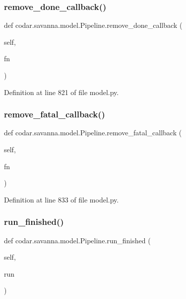 \subsubsection{\texorpdfstring{remove\+\_\+done\+\_\+callback()}{remove\_done\_callback()}}
{\footnotesize\ttfamily def codar.\+savanna.\+model.\+Pipeline.\+remove\+\_\+done\+\_\+callback (\begin{DoxyParamCaption}\item[{}]{self,  }\item[{}]{fn }\end{DoxyParamCaption})}



Definition at line 821 of file model.\+py.

\mbox{\label{classcodar_1_1savanna_1_1model_1_1_pipeline_a6ddff7f98a8fd2aa7066343540c8bab0}} 
\subsubsection{\texorpdfstring{remove\+\_\+fatal\+\_\+callback()}{remove\_fatal\_callback()}}
{\footnotesize\ttfamily def codar.\+savanna.\+model.\+Pipeline.\+remove\+\_\+fatal\+\_\+callback (\begin{DoxyParamCaption}\item[{}]{self,  }\item[{}]{fn }\end{DoxyParamCaption})}



Definition at line 833 of file model.\+py.

\mbox{\label{classcodar_1_1savanna_1_1model_1_1_pipeline_a0a7fe2d4e57a5604ae9d997caeee2f87}} 
\subsubsection{\texorpdfstring{run\+\_\+finished()}{run\_finished()}}
{\footnotesize\ttfamily def codar.\+savanna.\+model.\+Pipeline.\+run\+\_\+finished (\begin{DoxyParamCaption}\item[{}]{self,  }\item[{}]{run }\end{DoxyParamCaption})}



